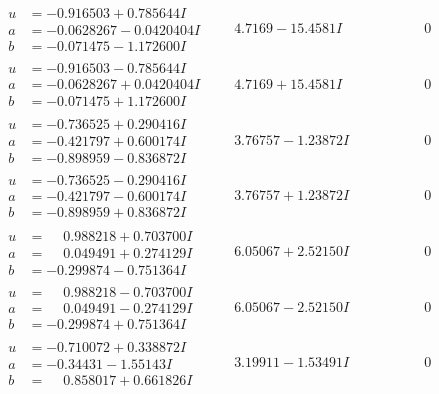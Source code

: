 \documentclass[1p]{elsarticle_modified}
\theoremstyle{definition}
\begin{document}
$$\begin{array}{c|c|c}
\begin{aligned}
u &= -0.916503 + 0.785644 I \\
a &= -0.0628267 - 0.0420404 I \\
b &= -0.071475 - 1.172600 I\end{aligned}
 & \phantom{-}4.7169 - 15.4581 I & \phantom{-0.000000 } 0 \\ \hline\begin{aligned}
u &= -0.916503 - 0.785644 I \\
a &= -0.0628267 + 0.0420404 I \\
b &= -0.071475 + 1.172600 I\end{aligned}
 & \phantom{-}4.7169 + 15.4581 I & \phantom{-0.000000 } 0 \\ \hline\begin{aligned}
u &= -0.736525 + 0.290416 I \\
a &= -0.421797 + 0.600174 I \\
b &= -0.898959 - 0.836872 I\end{aligned}
 & \phantom{-}3.76757 - 1.23872 I & \phantom{-0.000000 } 0 \\ \hline\begin{aligned}
u &= -0.736525 - 0.290416 I \\
a &= -0.421797 - 0.600174 I \\
b &= -0.898959 + 0.836872 I\end{aligned}
 & \phantom{-}3.76757 + 1.23872 I & \phantom{-0.000000 } 0 \\ \hline\begin{aligned}
u &= \phantom{-}0.988218 + 0.703700 I \\
a &= \phantom{-}0.049491 + 0.274129 I \\
b &= -0.299874 - 0.751364 I\end{aligned}
 & \phantom{-}6.05067 + 2.52150 I & \phantom{-0.000000 } 0 \\ \hline\begin{aligned}
u &= \phantom{-}0.988218 - 0.703700 I \\
a &= \phantom{-}0.049491 - 0.274129 I \\
b &= -0.299874 + 0.751364 I\end{aligned}
 & \phantom{-}6.05067 - 2.52150 I & \phantom{-0.000000 } 0 \\ \hline\begin{aligned}
u &= -0.710072 + 0.338872 I \\
a &= -0.34431 - 1.55143 I \\
b &= \phantom{-}0.858017 + 0.661826 I\end{aligned}
 & \phantom{-}3.19911 - 1.53491 I & \phantom{-0.000000 } 0 \\ \hline\begin{aligned}

\end{aligned}
\end{array}$$
\end{document}
